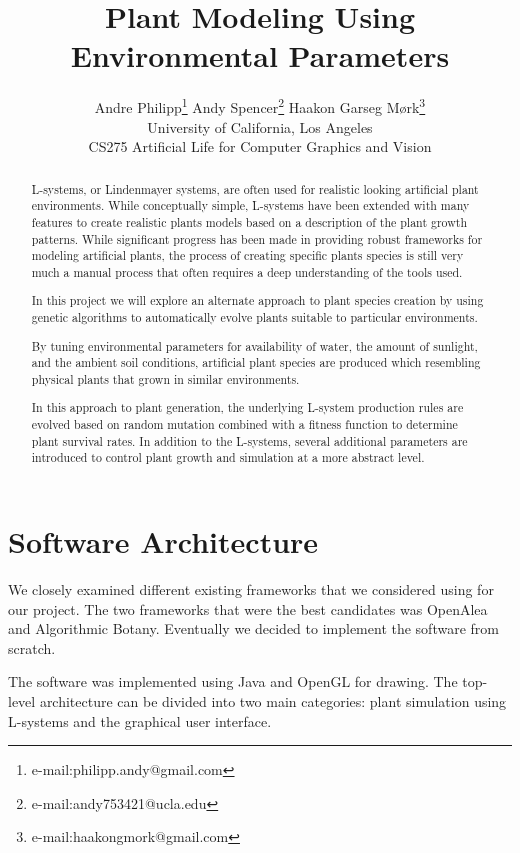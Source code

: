 \documentclass[conference]{acmsiggraph}
\title{Plant Modeling Using Environmental Parameters}
\author{
  Andre Philipp\thanks{e-mail:philipp.andy@gmail.com}
  \qquad
  Andy Spencer\thanks{e-mail:andy753421@ucla.edu}
  \qquad
  Haakon Garseg Mørk\thanks{e-mail:haakongmork@gmail.com}
  \\
  University of California, Los Angeles \\
  CS275 Artificial Life for Computer Graphics and Vision
}
\begin{document}

\maketitle

\begin{abstract}

L-systems, or Lindenmayer systems, are often used for realistic looking
artificial plant environments. While conceptually simple, L-systems have been
extended with many features to create realistic plants models based on a
description of the plant growth patterns. While significant progress has been
made in providing robust frameworks for modeling artificial plants, the process
of creating specific plants species is still very much a manual process that
often requires a deep understanding of the tools used.

In this project we will explore an alternate approach to plant species creation
by using genetic algorithms to automatically evolve plants suitable to
particular environments.

By tuning environmental parameters for availability of water, the amount of
sunlight, and the ambient soil conditions, artificial plant species are produced
which resembling physical plants that grown in similar environments.

In this approach to plant generation, the underlying L-system production rules
are evolved based on random mutation combined with a fitness function to
determine plant survival rates. In addition to the L-systems, several additional
parameters are introduced to control plant growth and simulation at a more
abstract level.

\end{abstract}

\keywordlist


\section{Software Architecture}

We closely examined different existing frameworks that we considered using for
our project. The two frameworks that were the best candidates was
OpenAlea\cite{openalea} and Algorithmic Botany\cite{abotany}. Eventually we
decided to implement the software from scratch.

The software was implemented using Java and OpenGL for drawing. The top-level
architecture can be divided into two main categories: plant simulation using
L-systems and the graphical user interface.
\end{document}
